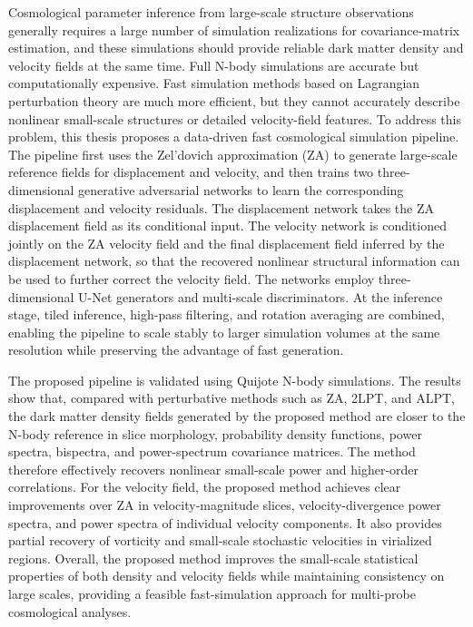 \begin{abstract*}
  Cosmological parameter inference from large-scale structure observations generally requires a large number of simulation realizations for covariance-matrix estimation, and these simulations should provide reliable dark matter density and velocity fields at the same time. Full N-body simulations are accurate but computationally expensive. Fast simulation methods based on Lagrangian perturbation theory are much more efficient, but they cannot accurately describe nonlinear small-scale structures or detailed velocity-field features. To address this problem, this thesis proposes a data-driven fast cosmological simulation pipeline. The pipeline first uses the Zel'dovich approximation (ZA) to generate large-scale reference fields for displacement and velocity, and then trains two three-dimensional generative adversarial networks to learn the corresponding displacement and velocity residuals. The displacement network takes the ZA displacement field as its conditional input. The velocity network is conditioned jointly on the ZA velocity field and the final displacement field inferred by the displacement network, so that the recovered nonlinear structural information can be used to further correct the velocity field. The networks employ three-dimensional U-Net generators and multi-scale discriminators. At the inference stage, tiled inference, high-pass filtering, and rotation averaging are combined, enabling the pipeline to scale stably to larger simulation volumes at the same resolution while preserving the advantage of fast generation.

  The proposed pipeline is validated using Quijote N-body simulations. The results show that, compared with perturbative methods such as ZA, 2LPT, and ALPT, the dark matter density fields generated by the proposed method are closer to the N-body reference in slice morphology, probability density functions, power spectra, bispectra, and power-spectrum covariance matrices. The method therefore effectively recovers nonlinear small-scale power and higher-order correlations. For the velocity field, the proposed method achieves clear improvements over ZA in velocity-magnitude slices, velocity-divergence power spectra, and power spectra of individual velocity components. It also provides partial recovery of vorticity and small-scale stochastic velocities in virialized regions. Overall, the proposed method improves the small-scale statistical properties of both density and velocity fields while maintaining consistency on large scales, providing a feasible fast-simulation approach for multi-probe cosmological analyses.

\end{abstract*}
